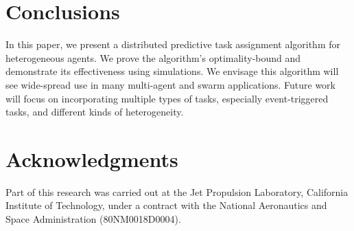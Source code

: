\documentclass[conference]{IEEEtran}
\newcommand{\mpmargin}[2]{{\color{cyan}#1}\marginpar{\color{cyan}\raggedright\footnotesize [MP]:#2}}
\newcommand{\frline}[2]{{\color{blue}#1}{\em \color{blue}[FR]: #2}}
\newcommand{\mpmargin}[2]{#1}
\newcommand{\frline}[2]{#1}
\begin{document}

\section{Conclusions}\label{sec:future}
In this paper, we present a distributed predictive task assignment algorithm for heterogeneous agents. 
We prove the algorithm's optimality-bound and demonstrate its effectiveness using simulations. 
We envisage this algorithm will see wide-spread use in many multi-agent and swarm applications. 
Future work will focus on incorporating multiple types of tasks, especially event-triggered tasks, and different kinds of heterogeneity.  


\section*{Acknowledgments}
Part of this research was carried out at the Jet Propulsion Laboratory, California Institute of Technology, under a contract with the National Aeronautics and Space Administration (80NM0018D0004).
\end{document}
